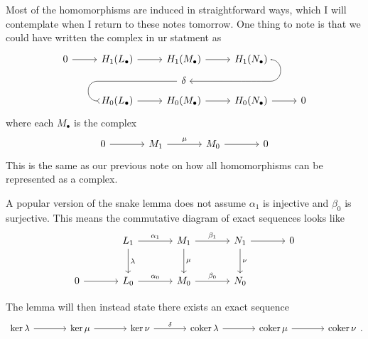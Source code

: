 Most of the homomorphisms are induced in straightforward ways, which I will contemplate when I return to these notes tomorrow. One thing to note is that we could have written the complex in ur statment as
\[
\begin{tikzcd}[row sep=0.5em, column sep=2.5em]
0 \arrow[r] & H_1(L_\bullet) \arrow[r] & H_1(M_\bullet) \arrow[r] & H_1(N_\bullet) \arrow[dl, rounded corners=10, to path={
    -- ([xshift=2ex]\tikztostart.east)
    |- ([yshift=-3ex]\tikztostart.south)
    -- ([xshift=3ex]\tikztotarget.west)
}] \\
&&\delta \arrow[dl, rounded corners=9, to path={
    -| ([xshift=-2ex]\tikztotarget.west)
    -- (\tikztotarget.west)
}]\\
& H_0(L_\bullet) \arrow[r] & H_0(M_\bullet) \arrow[r] & H_0(N_\bullet) \arrow[r] & 0
\end{tikzcd}
\]
where each $M_\bullet$ is the complex
\[\begin{tikzcd}[row sep=2.5em, column sep=3.5em]
	0\arrow[r]&M_1\arrow[r, "\mu "]&M_0\arrow[r]&0
\end{tikzcd}\]
This is the same as our previous note on how all homomorphisms can be represented as a complex.

A popular version of the snake lemma does not assume $\alpha_1$ is injective and $\beta_0$ is surjective. This means the commutative diagram of exact sequences looks like
	\[\begin{tikzcd}[row sep=2.5em, column sep=3.5em]
		&L_1\arrow[r, "\alpha _1"]\arrow[d, "\lambda "]&M_1\arrow[r, "\beta _1"]\arrow[d, "\mu "]&N_1\arrow[r]\arrow[d, "\nu "]&0\\
		0\arrow[r]&L_0\arrow[r, "\alpha _0"]&M_0\arrow[r, "\beta _0"]&N_0
\end{tikzcd}\]

The lemma will then instead state there exists an exact sequence
\[\begin{tikzcd}[row sep=2.5em, column sep=3.5em]
	\ker \lambda \arrow[r]&\ker \mu \arrow[r]&\ker \nu \arrow[r, "\delta "]&\coker \lambda \arrow[r]&\coker \mu \arrow[r]&\coker \nu 
\end{tikzcd}.\]


